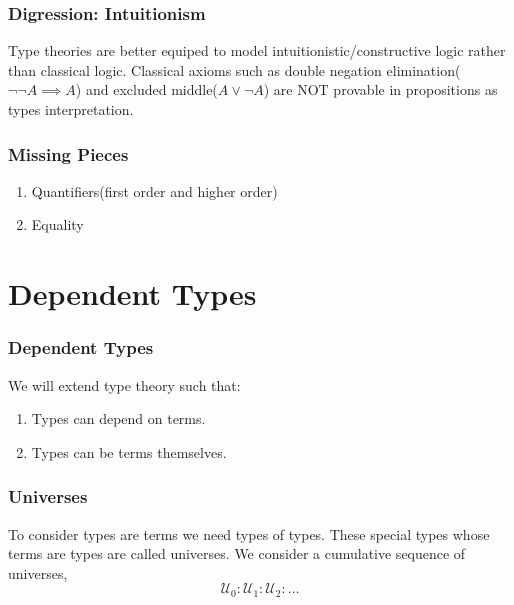 \documentclass[14pt,compress]{beamer}
\newcommand{\U}{\mathcal{U}}
\begin{document}
\begin{frame}\label{frame : intuitionism}
\frametitle{Digression: Intuitionism}
\pause
Type theories are better equiped to model
\textcolor{beamer@mathtext}{intuitionistic/constructive logic}
rather than \textcolor{beamer@mathtext}{classical logic}.
\pause
Classical axioms such as
\textcolor{beamer@mathtext}{double negation elimination($\neg \neg A \implies A$)} and
\textcolor{beamer@mathtext}{excluded middle($A \vee \neg A$)}
are NOT provable in propositions as types interpretation.

\end{frame}

\begin{frame}\label{frame : missing pieces}
\frametitle{Missing Pieces}
\begin{enumerate}
\item Quantifiers(first order and higher order)
\item Equality
\end{enumerate}
\end{frame}

\section{Dependent Types}
\begin{frame}\label{frame : dependent types}
\frametitle{Dependent Types}

We will extend type theory such that: 
\begin{enumerate}
\item Types can depend on terms.
\item Types can be terms themselves.
\end{enumerate}
\end{frame}

\begin{frame}\label{frame : universes}

\frametitle{Universes}
\pause
To consider types are terms we need types of types. These special types
whose terms are types are called \textcolor{beamer@mathtext}{universes}.
We consider a cumulative sequence of universes,
\textcolor{beamer@mathtext}{
\[ \U_0 : \U_1 : \U_2 :\dots \]}
\end{frame}
\end{document}
